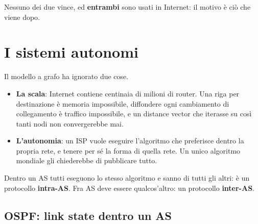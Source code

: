 
Nessuno dei due vince, ed \textbf{entrambi} sono usati in Internet: il motivo è ciò che viene dopo.

\section{I sistemi autonomi}

Il modello a grafo ha ignorato due cose.
\begin{itemize}
    \item \textbf{La scala}: Internet contiene centinaia di milioni di router. Una riga per destinazione è memoria impossibile,
          diffondere ogni cambiamento di collegamento è traffico impossibile, e un distance vector che iterasse su così tanti nodi
          non convergerebbe mai.
    \item \textbf{L'autonomia}: un ISP vuole eseguire l'algoritmo che preferisce dentro la propria rete, e tenere per sé la forma
          di quella rete. Un unico algoritmo mondiale gli chiederebbe di pubblicare tutto.
\end{itemize}


Dentro un AS tutti eseguono lo stesso algoritmo e sanno di tutti gli altri: è un protocollo \textbf{intra-AS}. Fra AS deve
essere qualcos'altro: un protocollo \textbf{inter-AS}.

\subsection{OSPF: link state dentro un AS}

